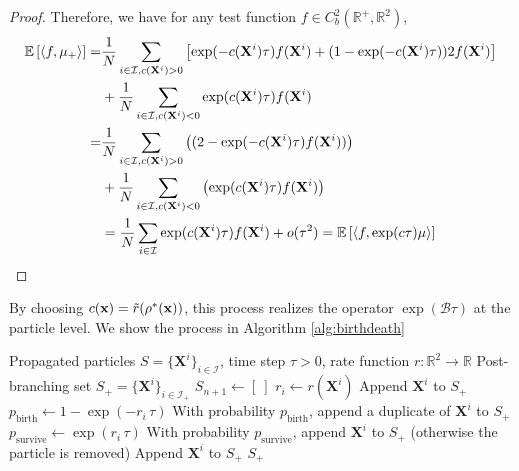 \documentclass[12pt]{article}
\begin{document}
\begin{proof}
    Therefore, we have for any test function $f\in C^2_b(\mathbb R^+, \mathbb R^2)$, 
\begin{equation}
\begin{aligned}
    \mathbb E\left[\left<f,  \mu_+\right>\right]   =& \frac{1}{N} \sum_{i\in \mathcal I ,c(\mathbf{X}^i)>0} 
    \left[\exp(- c(\mathbf{X}^i)\tau)f(\mathbf{X}^i) + (1-\exp( -c(\mathbf{X}^i)\tau))2f(\mathbf{X}^i)\right]\\
    & + \frac{1}{N} \sum_{i\in \mathcal I , c(\mathbf{X}^i)<0}
    \exp( c(\mathbf{X}^i)\tau)f(\mathbf{X}^i) \\
    =& \frac{1}{N}\sum_{i\in \mathcal I ,c(\mathbf{X}^i)>0} 
    \left(
    (2-\exp(- c(\mathbf{X}^i)\tau)f(\mathbf{X}^i))
    \right) \\
    & + \frac{1}{N}\sum_{i\in \mathcal I , c(\mathbf{X}^i)<0}\left(
    \exp( c(\mathbf{X}^i)\tau)f(\mathbf{X}^i) \right)\\
    & = \frac{1}{N}\sum_{i\in \mathcal I}\exp( c(\mathbf{X}^i)\tau)f(\mathbf{X}^i) + o(\tau^2)
    = \mathbb E\left[\left<f,\exp( c\tau)\mu\right>\right]   
\end{aligned}
\end{equation}
\end{proof}
By choosing $c(\mathbf{x})=\tilde r(\rho^*(\mathbf{x}))$, this process realizes the operator $\exp(\mathcal B\tau)$ at the particle level. We show the process in Algorithm \ref{alg:birthdeath}

\begin{algorithm}
\caption{Birth--Death Step}\label{alg:birthdeath}
\begin{algorithmic}
\Require Propagated particles $S=\{\mathbf X^{i}\}_{i\in\mathcal I}$, time step $\tau>0$, rate function $r:\mathbb R^2\to\mathbb R$
\Ensure Post-branching set $S_{+}=\{\mathbf X^{i}\}_{i\in\mathcal I_{+}}$
    \State $S_{n+1}\gets [\ ]$
        \State $r_i \gets r(\mathbf X^{i})$
         
            \State Append $\mathbf X^{i}$ to $S_{+}$ 
            \State $p_{\mathrm{birth}} \gets 1-\exp(-r_i\,\tau)$
            \State With probability $p_{\mathrm{birth}}$, append a duplicate of $\mathbf X^{i}$ to $S_{+}$
         
            \State $p_{\mathrm{survive}}\gets \exp(r_i\,\tau)$ 
            \State With probability $p_{\mathrm{survive}}$, append $\mathbf X^{i}$ to $S_{+}$
            \State \quad (otherwise the particle is removed)
        \Else {}
            \State Append $\mathbf X^{i}$ to $S_{+}$
        \EndIf
    \EndFor
    \State \Return $S_{+}$
\EndProcedure
\end{algorithmic}
\end{algorithm}
\end{document}
